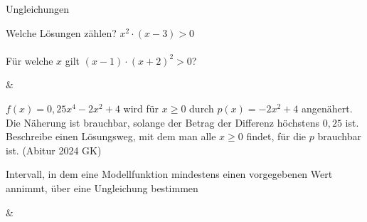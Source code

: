 \setcounter{aufgabe}{19}

\begin{aufgabe}{Ungleichungen}
\begin{teile}
\teil Welche Lösungen zählen? $x^2 \cdot (x - 3) > 0$  \\  \\ 
\teil Für welche $x$ gilt $(x - 1) \cdot (x + 2)^2 > 0$? \leerfeld
\end{teile}
\begin{gleichungsraster}[2]
 &
 \\
\end{gleichungsraster}
\begin{teile}
\teil $f(x) = 0{,}25x^4 - 2x^2 + 4$ wird für $x \ge 0$ durch $p(x) = -2x^2 + 4$ angenähert. Die Näherung ist brauchbar, solange der Betrag der Differenz höchstens $0{,}25$ ist. Beschreibe einen Lösungsweg, mit dem man alle $x \ge 0$ findet, für die $p$ brauchbar ist. \hfill (Abitur 2024 GK)
\end{teile}
\end{aufgabe}

\begin{aufgabe}{Intervall, in dem eine Modellfunktion mindestens einen vorgegebenen Wert annimmt, über eine Ungleichung bestimmen}
\begin{gleichungsraster}[2]
 & \\
\end{gleichungsraster}
\end{aufgabe}

